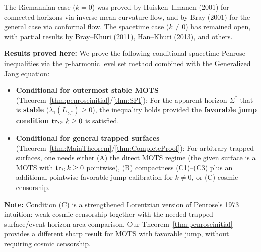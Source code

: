 The Riemannian case ($k = 0$) was proved by Huisken--Ilmanen (2001) for connected horizons via inverse mean curvature flow, and by Bray (2001) for the general case via conformal flow. The spacetime case ($k \neq 0$) has remained open, with partial results by Bray--Khuri (2011), Han--Khuri (2013), and others.

\textbf{Results proved here:} We prove the following conditional spacetime Penrose inequalities via the p-harmonic level set method combined with the Generalized Jang equation:
\begin{itemize}
    \item \textbf{Conditional for outermost stable MOTS} (Theorem~\ref{thm:penroseinitial}/\ref{thm:SPI}): For the apparent horizon $\Sigma^*$ that is \textbf{stable} ($\lambda_1(L_{\Sigma^*}) \ge 0$), the inequality holds provided the \textbf{favorable jump condition} $\operatorname{tr}_{\Sigma^*} k \ge 0$ is satisfied.
    \item \textbf{Conditional for general trapped surfaces} (Theorem~\ref{thm:MainTheorem}/\ref{thm:CompleteProof}): For arbitrary trapped surfaces, one needs either (A) the direct MOTS regime (the given surface is a MOTS with $\operatorname{tr}_\Sigma k \ge 0$ pointwise), (B) compactness (C1)--(C3) plus an additional pointwise favorable-jump calibration for $k \neq 0$, or (C) cosmic censorship.
\end{itemize}

\textbf{Note:} Condition (C) is a strengthened Lorentzian version of Penrose's 1973 intuition: weak cosmic censorship together with the needed trapped-surface/event-horizon area comparison. Our Theorem~\ref{thm:penroseinitial} provides a different sharp result for MOTS with favorable jump, without requiring cosmic censorship.

